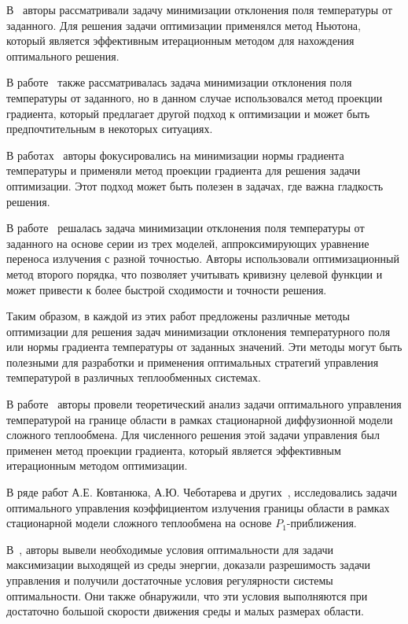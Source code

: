     В~\cite{frank2011adaptive, Pinnau2007b} авторы рассматривали задачу
    минимизации отклонения поля температуры от заданного.
    Для решения задачи оптимизации применялся метод Ньютона,
    который является эффективным итерационным методом для нахождения оптимального решения.

    В работе~\cite{lang2005adaptive} также рассматривалась задача минимизации
    отклонения поля температуры от заданного, но в данном случае использовался метод проекции градиента,
    который предлагает другой подход к оптимизации и может быть предпочтительным в некоторых ситуациях.

    В работах~\cite{clever2012optimal, Pinnau2013} авторы фокусировались на минимизации
    нормы градиента температуры и применяли метод проекции градиента для решения задачи оптимизации.
    Этот подход может быть полезен в задачах, где важна гладкость решения.

    В работе~\cite{clever2014model} решалась задача минимизации отклонения поля температуры
    от заданного на основе серии из трех моделей, аппроксимирующих уравнение переноса излучения с разной точностью.
    Авторы использовали оптимизационный метод второго порядка,
    что позволяет учитывать кривизну целевой функции и может привести к более быстрой сходимости и точности решения.

    Таким образом, в каждой из этих работ предложены различные методы
    оптимизации для решения задач минимизации отклонения температурного
    поля или нормы градиента температуры от заданных значений.
    Эти методы могут быть полезными для разработки и применения оптимальных
    стратегий управления температурой в различных теплообменных системах.


    В работе~\cite{Kovtanyuk2016Optimal} авторы провели теоретический анализ
    задачи оптимального управления температурой на границе области в рамках стационарной
    диффузионной модели сложного теплообмена.
    Для численного решения этой задачи управления был применен метод проекции
    градиента, который является эффективным итерационным методом оптимизации.

    В ряде работ А.Е. Ковтанюка, А.Ю. Чеботарева и
    других~\cite{Kovtanyuk2014, astrakhantseva2017design, Chebotarev2015, Kovtanyuk2014TheoreticalAnalysis},
    исследовались задачи оптимального управления коэффициентом
    излучения границы области в рамках стационарной модели сложного теплообмена на основе $P_1$-приближения.

    В~\cite{Kovtanyuk2014, Kovtanyuk2014TheoreticalAnalysis},
    авторы вывели необходимые условия оптимальности для задачи максимизации выходящей
    из среды энергии, доказали разрешимость задачи управления и получили
    достаточные условия регулярности системы оптимальности.
    Они также обнаружили, что эти условия выполняются при достаточно
    большой скорости движения среды и малых размерах области.


